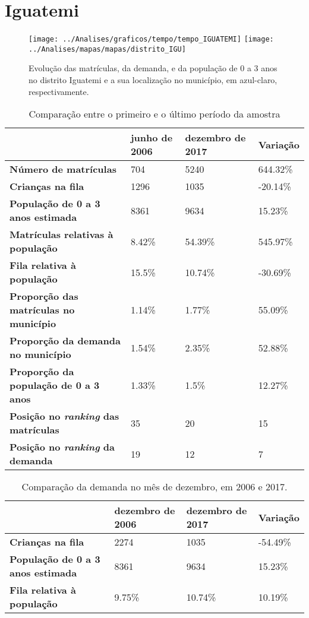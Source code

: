 \section{Iguatemi}
\begin{figure}[H]
\centering
\texttt{[image: ../Analises/graficos/tempo/tempo\_IGUATEMI]}
\texttt{[image: ../Analises/mapas/mapas/distrito\_IGU]}
\caption{Evolução das matrículas, da demanda, e da população de 0 a 3 anos no distrito Iguatemi e a sua localização no município, em azul-claro, respectivamente.}
\end{figure}
\begin{table}[H]
\begin{tabular}{l|l|l|l}
\textbf{}                                      & \textbf{junho de 2006}       & \textbf{dezembro de 2017}    & \textbf{Variação} \\ \hline
\textbf{Número de matrículas}                  & 704 & 5240 & 644.32\% \\ \hline
\textbf{Crianças na fila}                      & 1296 & 1035 & -20.14\% \\ \hline
\textbf{População de 0 a 3 anos estimada}      & 8361 & 9634 & 15.23\% \\ \hline
\textbf{Matrículas relativas à população}      & 8.42\% & 54.39\% & 545.97\% \\ \hline
\textbf{Fila relativa à população}             & 15.5\% & 10.74\% & -30.69\% \\ \hline
\textbf{Proporção das matrículas no município} & 1.14\% & 1.77\% & 55.09\% \\ \hline
\textbf{Proporção da demanda no município}     & 1.54\% & 2.35\% & 52.88\% \\ \hline
\textbf{Proporção da população de 0 a 3 anos}  & 1.33\% & 1.5\% & 12.27\% \\ \hline
\textbf{Posição no \textit{ranking} das matrículas}     & 35 & 20 & 15 \\ \hline
\textbf{Posição no \textit{ranking} da demanda}         & 19 & 12 & 7 \\ 
\end{tabular}
\caption{Comparação entre o primeiro e o último período da amostra}
\end{table}
\begin{table}[H]
\begin{tabular}{l|l|l|l}
\textbf{}                                 & \textbf{dezembro de 2006} & \textbf{dezembro de 2017} & \textbf{Variação} \\ \hline
\textbf{Crianças na fila}                      & 2274 & 1035 & -54.49\% \\ \hline
\textbf{População de 0 a 3 anos estimada}      & 8361 & 9634 & 15.23\% \\ \hline
\textbf{Fila relativa à população}             & 9.75\% & 10.74\% & 10.19\% \\
\end{tabular}
\caption{Comparação da demanda no mês de dezembro, em 2006 e 2017.}
\end{table}
